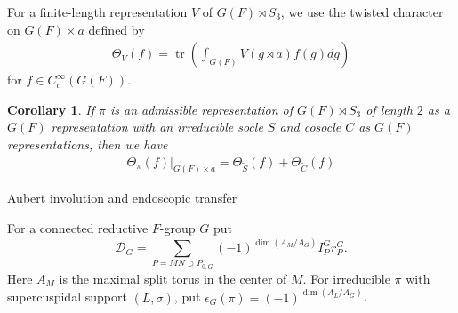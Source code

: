 \documentclass[12pt]{amsart}
\makeatletter
\renewcommand{\subsection}{\@startsection{subsection}{2}%
  \z@{.7\linespacing\@plus.5\linespacing}{.35\linespacing}%
  {\normalfont\bfseries\raggedright}}
\theoremstyle{definition}
\theoremstyle{plain}
\newtheorem{corollary}[definition]{Corollary}
\theoremstyle{remark}
\DeclareMathOperator{\tr}{tr}%
\numberwithin{equation}{section}
\makeatother
\begin{document}
For a finite-length representation $V$ of $G(F) \rtimes S_3$, we use the twisted character on $G(F) \times a$ defined by
\begin{align*}
      \Theta_V(f) = \tr \left( \int_{G(F)} V(g \rtimes a) f(g) dg \right)
\end{align*}
for $f \in C_c^{\infty}(G(F))$.

\begin{corollary}
      If $\pi$ is an admissible representation of $G(F) \rtimes S_3$ of length $2$ as a $G(F)$ representation with an irreducible socle $S$ and cosocle $C$ as $G(F)$ representations, then we have  
      \begin{align*}
            \Theta_{\pi}(f)|_{G(F) \times a} = \Theta_{\widetilde{S}}(f) + \Theta_{\widetilde{C}}(f)
      \end{align*}
\end{corollary}

\subsection{Aubert involution and endoscopic transfer}\label{subsec:aubert-involution-and-endoscopic-transfer}

For a connected reductive $F$-group $G$ put
\begin{equation}\label{eq:Aubert-operator}
 \mathcal D_G=\sum_{P=MN\supset P_{0,G}}
    (-1)^{\dim(A_M/A_G)}I_P^G r_P^G.
\end{equation}
Here $A_M$ is the maximal split torus in the center of $M$.
For irreducible $\pi$ with supercuspidal support $(L,\sigma)$, put
$\epsilon_G(\pi)=(-1)^{\dim(A_L/A_G)}$.
\end{document}

